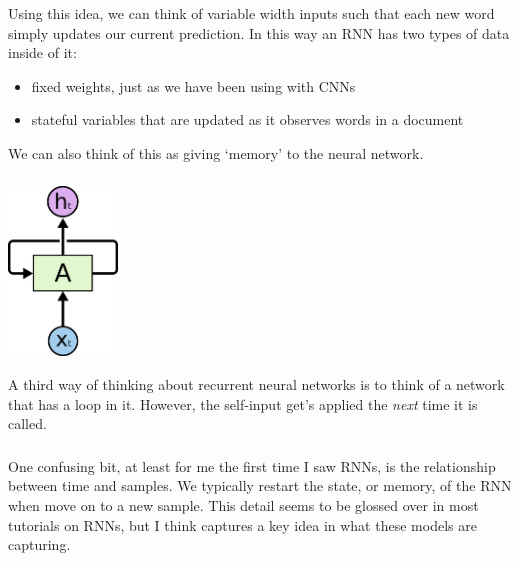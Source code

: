\documentclass[xetex,mathserif,serif,aspectratio=169]{beamer}
\begin{document}
\begin{frame}[fragile] \frametitle{} \oldB \small


Using this idea, we can think of variable width inputs
such that each new word simply updates our current prediction.
In this way an RNN has two types of data inside of it:
\begin{itemize}
\item fixed weights, just as we have been using with CNNs
\item stateful variables that are updated as it observes words
in a document
\end{itemize}
We can also think of this as giving `memory' to the neural
network.

\end{frame}

\begin{frame}[fragile] \frametitle{} \oldB \small

\begin{center}
\includegraphics[height=4.5cm]{img/cloah01.png}
\end{center}

A third way of thinking about recurrent neural networks is to
think of a network that has a loop in it. However, the self-input
get's applied the \textit{next} time it is called.

\end{frame}

\begin{frame}[fragile] \frametitle{} \oldB \small


One confusing bit, at least for me the first time I saw RNNs, is
the relationship between time and samples. We typically restart
the state, or memory, of the RNN when move on to a new sample.
This detail seems to be glossed over in most tutorials on RNNs,
but I think captures a key idea in what these models are capturing.

\end{frame}
\end{document}
